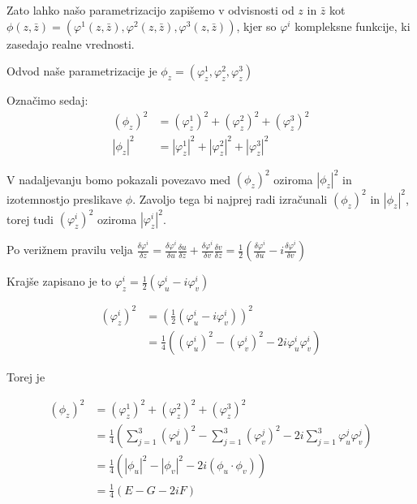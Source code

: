 \documentclass[mat1]{fmfdelo}
\begin{document}
Zato lahko našo parametrizacijo zapišemo v odvisnosti od $z$ in $\bar{z}$ kot 
$\phi(z, \bar{z}) = \left( \varphi^1(z, \bar{z}) , \varphi^2(z, \bar{z}) , \varphi^3(z, \bar{z}) \right)$,
kjer so $\varphi^{i}$ kompleksne funkcije, ki zasedajo realne vrednosti.

Odvod naše parametrizacije je $\phi_z = \left( \varphi^{1}_{z} , \varphi^{2}_{z} , \varphi^{3}_{z} \right)$

Označimo sedaj:
\begin{align*}
    \left( \phi_z \right)^2 &= (\varphi^{1}_{z})^2 + (\varphi^{2}_{z})^2 + (\varphi^{3}_{z})^2  \\
    \left\lvert \phi_z \right\rvert^2 &= \left\lvert \varphi^{1}_{z} \right\rvert^2 + \left\lvert \varphi^{2}_{z} \right\rvert^2 + \left\lvert \varphi^{3}_{z} \right\rvert^2 
\end{align*}

V nadaljevanju bomo pokazali povezavo med $\left( \phi_z \right)^2$ oziroma $\left\lvert \phi_z \right\rvert^2$ in 
izotemnostjo preslikave $\phi$.
Zavoljo tega bi najprej radi izračunali $\left( \phi_z \right)^2$ in $\left\lvert \phi_z \right\rvert^2$,
torej tudi $\left( \varphi^{i}_z \right)^2$ oziroma $\left\lvert \varphi^{i}_z \right\rvert^2$.

Po verižnem pravilu velja $ \frac{\delta \varphi^{i}}{\delta z} = \frac{\delta \varphi^{i}}{\delta u} \frac{\delta u}{\delta z} + 
\frac{\delta \varphi^{i}}{\delta v} \frac{\delta v}{\delta z} = \frac{1}{2} \left( \frac{\delta \varphi^{i}}{\delta u} - i \frac{\delta \varphi^{i}}{\delta v}\right)$

Krajše zapisano je to $\varphi^{i}_z = \frac{1}{2} \left( \varphi^{i}_u - i \varphi^{i}_v \right)$

\begin{align*}
    \left( \varphi^{i}_z \right)^2 &= \left( \frac{1}{2} (\varphi^{i}_u - i \varphi^{i}_v)\right)^2 \\
    &= \frac{1}{4} \left( (\varphi^{i}_u)^2 - (\varphi^{i}_v)^2 - 2i \varphi^{i}_u \varphi^{i}_v \right) 
\end{align*}

Torej je

\begin{align*}
    \left( \phi_z \right)^2 &= (\varphi^{1}_{z})^2 + (\varphi^{2}_{z})^2 + (\varphi^{3}_{z})^2  \\
    &= \frac{1}{4} \left( \sum_{j = 1}^{3} (\varphi^{j}_u)^2 - \sum_{j = 1}^{3} (\varphi^{j}_v)^2 - 2i \sum_{j = 1}^{3} \varphi^{j}_u \varphi^{j}_v \right) \\
    &= \frac{1}{4} \left( \left\lvert \phi_u \right\rvert^2 - \left\lvert \phi_v \right\rvert^2 - 2i (\phi_u \cdot \phi_v) \right) \\
    &= \frac{1}{4} \left( E - G - 2i F \right)
\end{align*}
\end{document}
